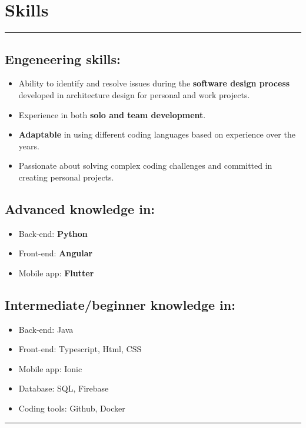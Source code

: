 \documentclass[a4paper,10pt]{article}
\begin{document}
\begin{minipage}[t]{0.25\textwidth}
    \section*{Skills}
    \vspace{6.4cm}
    \rule{0.6cm}{0.3mm}
\end{minipage}
\hfill
\begin{minipage}[t]{0.75\textwidth}
     \subsection*{Engeneering skills:}
    \begin{itemize}[leftmargin=1cm]
        \item Ability to  identify and resolve issues during the \textbf{software design process} developed in architecture design for personal and work projects.
        \item Experience in both  \textbf{solo and team development}.
        \item  \textbf{Adaptable} in using different coding languages based on experience over the years.
        \item Passionate about solving complex coding challenges and committed in creating personal projects.
    \end{itemize}
    \subsection*{Advanced knowledge in:}
    \begin{itemize}[leftmargin=1cm]
        \item Back-end: \textbf{Python} 
        \item Front-end: \textbf{Angular}
        \item Mobile app: \textbf{Flutter}
    \end{itemize}
    \subsection*{Intermediate/beginner knowledge in:}
    \begin{itemize}[leftmargin=1cm]
        \item Back-end: Java
        \item Front-end: Typescript, Html, CSS
        \item Mobile app: Ionic
        \item Database: SQL, Firebase
        \item Coding tools: Github, Docker
    \end{itemize}

    \rule{\linewidth}{0.5mm}
\end{minipage}
\end{document}
